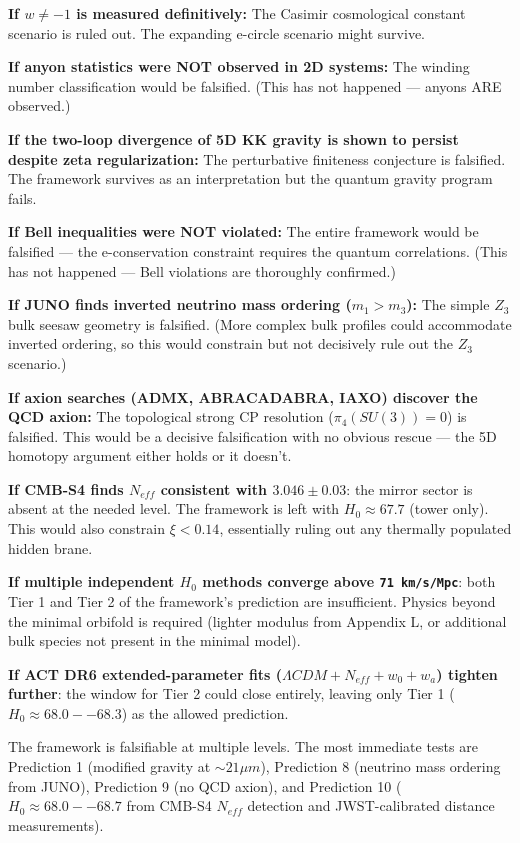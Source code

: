 \documentclass[aps,prd,preprint,superscriptaddress,longbibliography,floatfix]{revtex4-2}
\theoremstyle{remark}
\begin{document}
\textbf{If $w \neq -1$ is measured definitively:} The Casimir cosmological constant scenario is ruled out. The expanding e-circle scenario might survive.

\textbf{If anyon statistics were NOT observed in 2D systems:} The winding number classification would be falsified. (This has not happened --- anyons ARE observed.)

\textbf{If the two-loop divergence of 5D KK gravity is shown to persist despite zeta regularization:} The perturbative finiteness conjecture is falsified. The framework survives as an interpretation but the quantum gravity program fails.

\textbf{If Bell inequalities were NOT violated:} The entire framework would be falsified --- the e-conservation constraint requires the quantum correlations. (This has not happened --- Bell violations are thoroughly confirmed.)

\textbf{If JUNO finds inverted neutrino mass ordering ($m_{1} > m_{3}$):} The simple $Z_{3}$ bulk seesaw geometry is falsified. (More complex bulk profiles could accommodate inverted ordering, so this would constrain but not decisively rule out the $Z_{3}$ scenario.)

\textbf{If axion searches (ADMX, ABRACADABRA, IAXO) discover the QCD axion:} The topological strong CP resolution ($\pi_{4}(SU(3)) = 0$) is falsified. This would be a decisive falsification with no obvious rescue --- the 5D homotopy argument either holds or it doesn't.

\textbf{If CMB-S4 finds $N_{eff}$ consistent with $3.046 \pm 0.03$}: the mirror sector is absent at the needed level. The framework is left with $H_{0} \approx 67.7$ (tower only). This would also constrain $\xi < 0.14$, essentially ruling out any thermally populated hidden brane.

\textbf{If multiple independent $H_{0}$ methods converge above \texttt{71 km/s/Mpc}}: both Tier 1 and Tier 2 of the framework's prediction are insufficient. Physics beyond the minimal orbifold is required (lighter modulus from Appendix L, or additional bulk species not present in the minimal model).

\textbf{If ACT DR6 extended-parameter fits ($\Lambda CDM + N_{eff} + w_{0} + w_{a}$) tighten further}: the window for Tier 2 could close entirely, leaving only Tier 1 ($H_{0} \approx 68.0--68.3$) as the allowed prediction.

The framework is falsifiable at multiple levels. The most immediate tests are Prediction 1 (modified gravity at $\sim 21 \mu m$), Prediction 8 (neutrino mass ordering from JUNO), Prediction 9 (no QCD axion), and Prediction 10 ($H_{0} \approx 68.0--68.7$ from CMB-S4 $N_{eff}$ detection and JWST-calibrated distance measurements).
\end{document}
